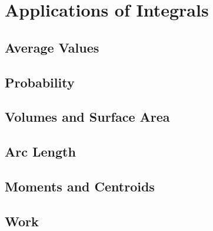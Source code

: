 \section{Applications of Integrals}

\subsection{Average Values}

\subsection{Probability}

\subsection{Volumes and Surface Area}

\subsection{Arc Length}

\subsection{Moments and Centroids}

\subsection{Work}
